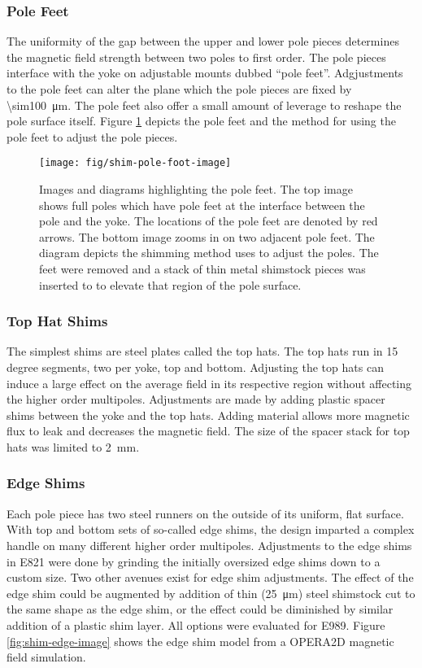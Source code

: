 \subsubsection{Pole Feet}
The uniformity of the gap between the upper and lower pole pieces determines the magnetic field strength between two poles to first order. The pole pieces interface with the yoke on adjustable mounts dubbed ``pole feet''.  Adgjustments to the pole feet can alter the plane which the pole pieces are fixed by \SI{\sim100}{\micro \meter}.  The pole feet also offer a small amount of leverage to reshape the pole surface itself.  Figure \ref{fig:shim-pole-foot-image} depicts the pole feet and the method for using the pole feet to adjust the pole pieces.

\begin{figure}
\centering
\texttt{[image: fig/shim-pole-foot-image]}
\caption{
    Images and diagrams highlighting the pole feet.  The top image shows full poles which have pole feet at the interface between the pole and the yoke.  The locations of the pole feet are denoted by red arrows. The bottom image zooms in on two adjacent pole feet.  The diagram depicts the shimming method uses to adjust the poles.  The feet were removed and a stack of thin metal shimstock pieces was inserted to to elevate that region of the pole surface. 
    \label{fig:shim-pole-foot-image}
}
\end{figure}


\subsubsection{Top Hat Shims}
The simplest shims are steel plates called the top hats.  The top hats run in 15 degree segments, two per yoke, top and bottom.  Adjusting the top hats can induce a large effect on the average field in its respective region without affecting the higher order multipoles.  Adjustments are made by adding plastic spacer shims between the yoke and the top hats.  Adding material allows more magnetic flux to leak and decreases the magnetic field.  The size of the spacer stack for top hats was limited to \SI{2}{\mm}.

\subsubsection{Edge Shims}
Each pole piece has two steel runners on the outside of its uniform, flat surface.  With top and bottom sets of so-called edge shims, the design imparted a complex handle on many different higher order multipoles.  Adjustments to the edge shims in E821 were done by grinding the initially oversized edge shims down to a custom size.  Two other avenues exist for edge shim adjustments. The effect of the edge shim could be augmented by addition of thin (\SI{25}{\micro \meter}) steel shimstock cut to the same shape as the edge shim, or the effect could be diminished by similar addition of a plastic shim layer.  All options were evaluated for E989.  Figure \ref{fig:shim-edge-image} shows the edge shim model from a OPERA2D magnetic field simulation.  

